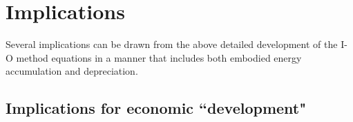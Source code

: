%
%
%
\chapter{Implications}
\label{chap:implications} %





Several implications can be drawn from the above detailed development of the I-O method equations in a manner that includes both embodied energy accumulation and depreciation.

\section{Implications for economic ``development"}

